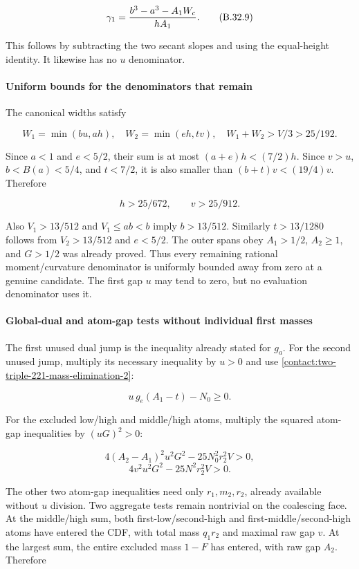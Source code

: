 \[
 \gamma_1={b^3-a^3-A_1W_c\over hA_1}.
\tag{B.32.9}\label{contact:two-triple-221-mass-elimination-9}
\]

This follows by subtracting the two secant slopes and using the equal-height
identity. It likewise has no $u$ denominator.

\paragraph{Uniform bounds for the denominators that remain}

The canonical widths satisfy

\[
 W_1=\min(bu,ah),\quad W_2=\min(eh,tv),\quad
 W_1+W_2>V/3>25/192.
\]

Since $a<1$ and $e<5/2$, their sum is at most $(a+e)h<(7/2)h$.
Since $v>u$, $b<B(a)<5/4$, and $t<7/2$, it is also smaller than
$(b+t)v<(19/4)v$. Therefore

\[
 \boxed{h>25/672,\qquad v>25/912.}
\tag{B.32.10}\label{contact:two-triple-221-mass-elimination-10}
\]

Also $V_1>13/512$ and $V_1\le ab<b$ imply $b>13/512$.
Similarly $t>13/1280$ follows from $V_2>13/512$ and $e<5/2$.
The outer spans obey $A_1>1/2$, $A_2\ge 1$, and $G>1/2$ was already proved.
Thus every remaining rational moment/curvature denominator is uniformly
bounded away from zero at a genuine candidate. The first gap $u$ may tend
to zero, but no evaluation denominator uses it.

\paragraph{Global-dual and atom-gap tests without individual first masses}

The first unused dual jump is the inequality already stated for $g_a$. For the second unused jump,
multiply its necessary inequality by $u>0$ and use \eqref{contact:two-triple-221-mass-elimination-2}:

\[
 \boxed{u\,g_e(A_1-t)-N_0\geq0.}
\tag{B.32.11}\label{contact:two-triple-221-mass-elimination-11}
\]

For the excluded low/high and middle/high atoms, multiply the squared
atom-gap inequalities by $(uG)^2>0$:

\[
 4(A_2-A_1)^2u^2G^2-25N_0^2r_2^2V>0,
\]
\[
 4v^2u^2G^2-25N^2r_2^2V>0.
\tag{B.32.12}\label{contact:two-triple-221-mass-elimination-12}
\]

The other two atom-gap inequalities need only $r_1,m_2,r_2$, already
available without $u$ division. Two aggregate tests remain nontrivial on
the coalescing face. At the middle/high sum, both first-low/second-high and
first-middle/second-high atoms have entered the CDF, with total mass
$q_1r_2$ and maximal raw gap $v$. At the largest sum, the entire excluded
mass $1-F$ has entered, with raw gap $A_2$. Therefore

